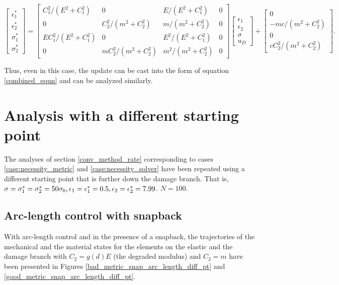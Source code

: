 \documentclass[10pt]{cas-sc}
\newcommand{\deleted}[1]{}
\newcommand{\added}[1]{#1}
\begin{document}
\begin{equation}
	\begin{bmatrix}
		\epsilon_1^* \\
		\epsilon_2^* \\
		\sigma_1^* \\
		\sigma_2^* 
	\end{bmatrix} 
	= 
	\begin{bmatrix}
		C_1^2/(E^2 + C_1^2) & 0 & E/(E^2 + C_1^2) & 0 \\
		0 & C_2^2/(m^2 + C_2^2)  & m/(m^2 + C_2^2) &0 \\
		E C_1^2/(E^2 + C_1^2) & 0 & E^2/(E^2 + C_1^2) &0\\
		0 & mC_2^2/(m^2 + C_2^2)  & m^2/(m^2 + C_2^2) &0
	\end{bmatrix} 
	\begin{bmatrix}
		\epsilon_1 \\
		\epsilon_2 \\
		\sigma \\
		u_D
	\end{bmatrix} + 
	\begin{bmatrix}
		0 \\
		-mc/(m^2+C_2^2) \\
		0 \\
		cC_2^2/(m^2+C_2^2)
	\end{bmatrix} .\label{big_update_mat_al}
\end{equation}

Thus, even in this case, the update can be cast into the form of equation \ref{combined_equn} and can be analyzed similarly.

\section{Analysis with a different starting point\label{different_starting_point}}
The analyses of section \ref{conv_method_rate} \added{corresponding to cases \ref{case:necessity_metric} and \ref{case:necessity_solver}} have been repeated using a different starting point that is further down the damage branch. That is, ${\sigma}={\sigma}_1^*={\sigma}_2^*=50 \sigma_0,{\epsilon}_1={\epsilon}_1^* =0.5,{\epsilon}_2={\epsilon}_2^* =7.99$. \added{$N=100$.} \deleted{Two cases have been analyzed: without snapback under displacement control, and with snapback using arc-length solver. }

\subsection*{Arc-length control with snapback}
\deleted{The bar is discretized with $101$ elements. }With arc-length control and in the presence of a snapback, the trajectories of the mechanical and the material states for the elements on the elastic and the damage branch with $C_2 = g(d) E$ (the degraded modulus) and $C_2 = m$ have been presented in Figures \ref{bad_metric_snap_arc_length_diff_pt} and \ref{good_metric_snap_arc_length_diff_pt}.
\end{document}
